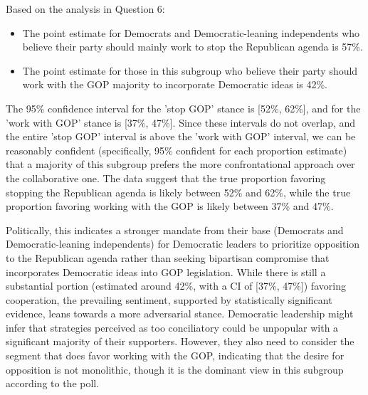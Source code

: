 \documentclass[12pt]{article}
\begin{document}
\begin{enumerate}
Based on the analysis in Question 6:
\begin{itemize}
    \item The point estimate for Democrats and Democratic-leaning independents who believe their party should mainly work to stop the Republican agenda is 57\%.
    \item The point estimate for those in this subgroup who believe their party should work with the GOP majority to incorporate Democratic ideas is 42\%.
\end{itemize}
The 95\% confidence interval for the 'stop GOP' stance is [52\%, 62\%], and for the 'work with GOP' stance is [37\%, 47\%]. Since these intervals do not overlap, and the entire 'stop GOP' interval is above the 'work with GOP' interval, we can be reasonably confident (specifically, 95\% confident for each proportion estimate) that a majority of this subgroup prefers the more confrontational approach over the collaborative one. The data suggest that the true proportion favoring stopping the Republican agenda is likely between 52\% and 62\%, while the true proportion favoring working with the GOP is likely between 37\% and 47\%.

Politically, this indicates a stronger mandate from their base (Democrats and Democratic-leaning independents) for Democratic leaders to prioritize opposition to the Republican agenda rather than seeking bipartisan compromise that incorporates Democratic ideas into GOP legislation. While there is still a substantial portion (estimated around 42\%, with a CI of [37\%, 47\%]) favoring cooperation, the prevailing sentiment, supported by statistically significant evidence, leans towards a more adversarial stance. Democratic leadership might infer that strategies perceived as too conciliatory could be unpopular with a significant majority of their supporters. However, they also need to consider the segment that does favor working with the GOP, indicating that the desire for opposition is not monolithic, though it is the dominant view in this subgroup according to the poll.
\end{enumerate}
\end{document}

